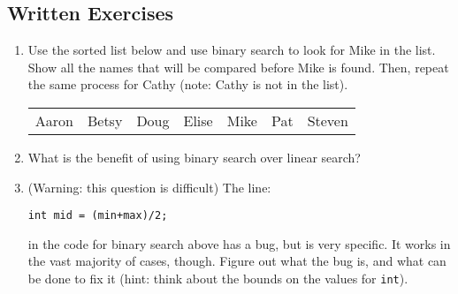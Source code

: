 \subsection{Written Exercises}

\setcounter{counter}{1}
\begin{enumerate}[label={\arabic{counter}\addtocounter{counter}{1}}.]

\item Use the sorted list below and use binary search to look for Mike in the list. Show all the names that will be compared before Mike is found. Then, repeat the same process for Cathy (note: Cathy is not in the list).
\begin{table}[h]
\begin{tabular}{lllllll}
Aaron & Betsy & Doug & Elise & Mike & Pat & Steven
\end{tabular}
\end{table}

\item What is the benefit of using binary search over linear search?

\item (Warning: this question is difficult) The line:
\begin{lstlisting}
int mid = (min+max)/2;
\end{lstlisting}
in the code for binary search above has a bug, but is very specific. It works in the vast majority of cases, though. Figure out what the bug is, and what can be done to fix it (hint: think about the bounds on the values for \verb|int|).

\end{enumerate}